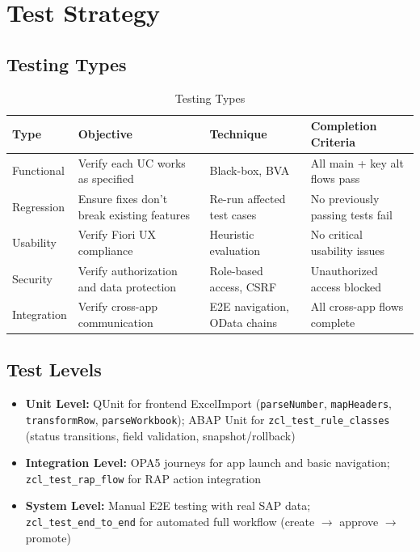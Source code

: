 \documentclass[12pt,a4paper]{report}
\begin{document}
\section{Test Strategy}

\subsection{Testing Types}

\begin{table}[H]
\centering\small
\begin{tabularx}{\textwidth}{|l|X|X|X|}
  \hline
  \rowcolor{tableheadpeach}
  \textbf{Type} & \textbf{Objective} & \textbf{Technique} & \textbf{Completion Criteria} \\ \hline
  Functional   & Verify each UC works as specified           & Black-box, BVA              & All main + key alt flows pass \\ \hline
  Regression   & Ensure fixes don't break existing features  & Re-run affected test cases  & No previously passing tests fail \\ \hline
  Usability    & Verify Fiori UX compliance                  & Heuristic evaluation        & No critical usability issues \\ \hline
  Security     & Verify authorization and data protection    & Role-based access, CSRF     & Unauthorized access blocked \\ \hline
  Integration  & Verify cross-app communication              & E2E navigation, OData chains& All cross-app flows complete \\ \hline
\end{tabularx}
\caption{Testing Types}
\label{tab:testing-types}
\end{table}

\subsection{Test Levels}

\begin{itemize}[leftmargin=2em]
  \item \textbf{Unit Level:} QUnit for frontend ExcelImport (\texttt{parseNumber}, \texttt{mapHeaders}, \texttt{transformRow}, \texttt{parseWorkbook}); ABAP Unit for \texttt{zcl\_test\_rule\_classes} (status transitions, field validation, snapshot/rollback)
  \item \textbf{Integration Level:} OPA5 journeys for app launch and basic navigation; \texttt{zcl\_test\_rap\_flow} for RAP action integration
  \item \textbf{System Level:} Manual E2E testing with real SAP data; \texttt{zcl\_test\_end\_to\_end} for automated full workflow (create $\rightarrow$ approve $\rightarrow$ promote)
\end{itemize}
\end{document}
